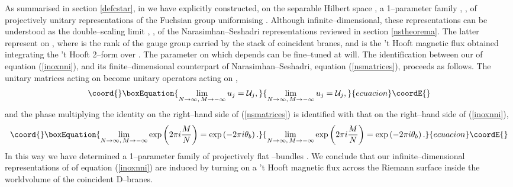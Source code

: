 \documentclass[a4paper,a4paper]{article}
\begin{document}
As summarised in section \ref{defcstar}, in \cite{PROCEEDINGS} we have 
explicitly constructed, on the separable  Hilbert space \coordHE{}, 
a 1--parameter family  \coordHE{}, \coordHE{}, of projectively unitary representations 
of the Fuchsian group \coordHE{} uniformising \myHighlight{$\Sigma$}\coordHE{}.
Although infinite--dimensional, these representations \coordHE{} can be understood 
as the double--scaling limit \coordHE{},  \coordHE{}, 
of the Narasimhan--Seshadri representations \coordHE{} reviewed in section \ref{nstheorema}. 
The latter represent \coordHE{} on \coordHE{}, where \coordHE{} is the rank 
of the gauge group \coordHE{} carried by the stack of \coordHE{} coincident branes, 
and \coordHE{} is the 't Hooft magnetic flux obtained integrating 
the 't Hooft 2--form \myHighlight{$[f]$}\coordHE{} over \myHighlight{$\Sigma$}\coordHE{}. The parameter \coordHE{} 
on which \coordHE{} depends can be fine--tuned at will. The identification between  
our \coordHE{} of equation (\ref{inoxnni}), and its finite--dimensional counterpart 
\coordHE{} of Narasimhan--Seshadri,  equation (\ref{nsmatrices}), 
proceeds as follows. The \coordHE{} unitary matrices \coordHE{} acting 
on \coordHE{} become unitary operators \coordHE{} acting on \coordHE{},
\begin{equation}\coord{}\boxEquation{  
\lim_{N\to\infty,\,M\to -\infty}u_j={\cal U}_j,
\label{identification}
}{  
\lim_{N\to\infty,\,M\to -\infty}u_j={\cal U}_j,
}{ecuacion}\coordE{}\end{equation} 
and the phase multiplying the identity on the right--hand side of 
(\ref{nsmatrices})
is identified with that on the right--hand side of (\ref{inoxnni}),
\begin{equation}\coord{}\boxEquation{
\lim_{N\to\infty,\,M\to -\infty}
\exp \left(2\pi i {M\over N}\right)=
\exp \left(-2\pi i \theta_b\right).  
\label{identificationx}
}{
\lim_{N\to\infty,\,M\to -\infty}
\exp \left(2\pi i {M\over N}\right)=
\exp \left(-2\pi i \theta_b\right).  
}{ecuacion}\coordE{}\end{equation} 
In this way we have determined a 1--parameter family of projectively flat 
\coordHE{}--bundles \coordHE{}. We conclude that   
our infinite--dimensional representations \coordHE{} of \coordHE{}
of equation (\ref{inoxnni}) are induced by turning on a 't Hooft magnetic 
flux across the Riemann surface \myHighlight{$\Sigma$}\coordHE{} inside the worldvolume of the 
\coordHE{} coincident D\coordHE{}--branes. 
\end{document}
